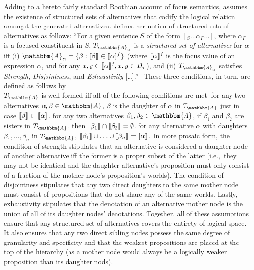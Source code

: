 Adding to a hereto fairly standard Roothian account of focus semantics, \textcite{Ippolito2020} assumes the existence of structured sets of alternatives that codify the logical relation amongst the generated alternatives. \textcite{Ippolito2020} defines her notion of structured sets of alternatives as follows: \enquote{For a given sentence $S$ of the form $[_S\ldots\alpha_F\ldots]$, where $\alpha_F$ is a focused constituent in $S$, $T_{\mathbbm{A}_\alpha}$ is a \textit{structured set of alternatives} for $\alpha$ iff (i) $\mathbbm{A}_\alpha=\{\beta:\intension[]{$\beta$}\in\intension[f]{$\alpha$}\}$ (where $\intension[f]{$\alpha$}$ is the focus value of an expression $\alpha$, and for any $x,y\in\intension[f]{$\alpha$}, x,y\in D_\tau$), and (ii) $T_{\mathbbm{A}_\alpha}$ satisfies \textit{Strength}, \textit{Disjointness}, and \textit{Exhaustivity} [\dots].}~\parencite[p. 640]{Ippolito2020} These three conditions, in turn, are defined as follows by \textcite{Ippolito2020}:
\pex{}\label{def:alternativeconstruction}
\\
$T_\mathbbm{A}$ is well-formed iff all of the following conditions are met:
\a{} {} for any two alternatives $\alpha,\beta\in\mathbbm{A}$, $\beta$ is the daughter of $\alpha$ in $T_\mathbbm{A}$ just in case $\intension[]{$\beta$}\subset\intension[]{$\alpha$}$.
\a{} {} for any two alternatives $\beta_1,\beta_2\in\mathbbm{A}$, if $\beta_1$ and $\beta_2$ are sisters in $T_\mathbbm{A}$, then $\intension[]{$\beta_1$}\cap\intension[]{$\beta_2$}=\emptyset$.
\a{} {} for any alternative $\alpha$ with daughters $\beta_1,\ldots,\beta_n$ in $T_\mathbbm{A}$, $\intension[]{$\beta_1$}\cup\ldots\cup\intension[]{$\beta_n$}=\intension[]{$\alpha$}$.\hfill\parencite[p. 640]{Ippolito2020}
\xe
In more prosaic form, the condition of strength stipulates that an alternative is considered a daughter node of another alternative iff the former is a proper subset of the latter (i.e.,~they may not be identical and the daughter alternative's proposition must only consist of a fraction of the mother node's proposition's worlds). The condition of disjointness stipulates that any two direct daughters to the same mother node must consist of propositions that do not share any of the same worlds. Lastly, exhaustivity stipulates that the denotation of an alternative mother node is the union of all of its daughter nodes' denotations. Together, all of these assumptions ensure that any structured set of alternatives covers the entirety of logical space. It also ensures that any two direct sibling nodes possess the same degree of granularity and specificity and that the weakest propositions are placed at the top of the hierarchy (as a mother node would always be a logically weaker proposition than its daughter nods).


